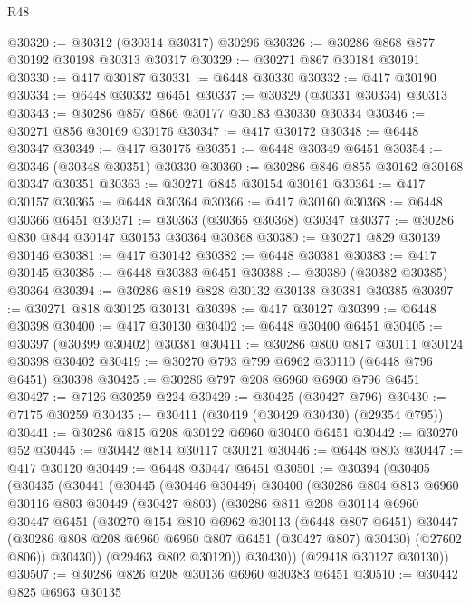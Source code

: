 \begin{lexlean}{R48}
\begin{coremodule}
@30320 := @30312 (@30314 @30317) @30296
@30326 := @30286 @868 @877 @30192 @30198 @30313 @30317
@30329 := @30271 @867 @30184 @30191
@30330 := @417 @30187
@30331 := @6448 @30330
@30332 := @417 @30190
@30334 := @6448 @30332 @6451
@30337 := @30329 (@30331 @30334) @30313
@30343 := @30286 @857 @866 @30177 @30183 @30330 @30334
@30346 := @30271 @856 @30169 @30176
@30347 := @417 @30172
@30348 := @6448 @30347
@30349 := @417 @30175
@30351 := @6448 @30349 @6451
@30354 := @30346 (@30348 @30351) @30330
@30360 := @30286 @846 @855 @30162 @30168 @30347 @30351
@30363 := @30271 @845 @30154 @30161
@30364 := @417 @30157
@30365 := @6448 @30364
@30366 := @417 @30160
@30368 := @6448 @30366 @6451
@30371 := @30363 (@30365 @30368) @30347
@30377 := @30286 @830 @844 @30147 @30153 @30364 @30368
@30380 := @30271 @829 @30139 @30146
@30381 := @417 @30142
@30382 := @6448 @30381
@30383 := @417 @30145
@30385 := @6448 @30383 @6451
@30388 := @30380 (@30382 @30385) @30364
@30394 := @30286 @819 @828 @30132 @30138 @30381 @30385
@30397 := @30271 @818 @30125 @30131
@30398 := @417 @30127
@30399 := @6448 @30398
@30400 := @417 @30130
@30402 := @6448 @30400 @6451
@30405 := @30397 (@30399 @30402) @30381
@30411 := @30286 @800 @817 @30111 @30124 @30398 @30402
@30419 := @30270 @793 @799 @6962 @30110 (@6448 @796 @6451) @30398
@30425 := @30286 @797 @208 @6960 @6960 @796 @6451
@30427 := @7126 @30259 @224
@30429 := @30425 (@30427 @796)
@30430 := @7175 @30259
@30435 := @30411 (@30419 (@30429 @30430) (@29354 @795))
@30441 := @30286 @815 @208 @30122 @6960 @30400 @6451
@30442 := @30270 @52
@30445 := @30442 @814 @30117 @30121
@30446 := @6448 @803
@30447 := @417 @30120
@30449 := @6448 @30447 @6451
@30501 := @30394
    (@30405
      (@30435
        (@30441
          (@30445
            (@30446 @30449)
            @30400
            (@30286
              @804
              @813
              @6960
              @30116
              @803
              @30449
              (@30427 @803)
              (@30286
                @811
                @208
                @30114
                @6960
                @30447
                @6451
                (@30270
                  @154
                  @810
                  @6962
                  @30113
                  (@6448 @807 @6451)
                  @30447
                  (@30286 @808 @208 @6960 @6960 @807 @6451 (@30427 @807) @30430)
                  (@27602 @806))
                @30430))
            (@29463 @802 @30120))
          @30430))
      (@29418 @30127 @30130))
@30507 := @30286 @826 @208 @30136 @6960 @30383 @6451
@30510 := @30442 @825 @6963 @30135

\end{coremodule}
\end{lexlean}
